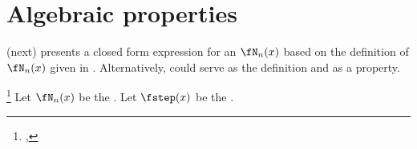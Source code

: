\section{Algebraic properties}
 (next) presents a closed form expression for an  $\fN_n(x)$
based on the definition of $\fN_n(x)$ given in .
Alternatively,  could serve as the definition and  as a property.
\begin{theorem}
\footnote{
  ,
  }
\label{thm:Nnx}
Let $\fN_n(x)$ be the  .
Let $\fstep(x)$ be the  .
\end{theorem}
